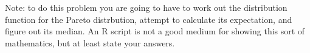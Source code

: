 \documentclass[12pt]{article}
\begin{document}
\begin{enumerate}
Note: to do this problem you are going to have to work out the distribution function for the Pareto distrbution, attempt to calculate its expectation, and figure out its median. An R script is not a good medium for showing this sort of mathematics, but at least state your answers.




\end{enumerate}





\pagebreak
\end{document}
